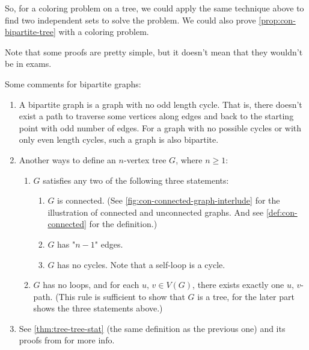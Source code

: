 \documentclass[../src/handouts/main.tex]{subfiles}
\begin{document}
So, for a coloring problem on a tree, we could apply the same technique above to find two independent sets to solve the problem. We could also prove \cref{prop:con-bipartite-tree} with a coloring problem. %

Note that some proofs are pretty simple, but it doesn't mean that they wouldn't be in exams.

Some comments for bipartite graphs:
\begin{enumerate}
  \item \label{enum:con-bipartite-odd} A bipartite graph is a graph with no odd length cycle. That is, there doesn't exist a path to traverse some vertices along edges and back to the starting point with odd number of edges. For a graph with no possible cycles or with only even length cycles, such a graph is also bipartite. 

  \item \label{enum:con-tree-state} Another ways to define an $n$-vertex tree $G$, where $n \geq 1$:
    \begin{enumerate}
      \item $G$ satisfies any two of the following three statements:
        \begin{enumerate}
          \item $G$ is connected. (See \cref{fig:con-connected-graph-interlude} for the illustration of connected and unconnected graphs. And see \cref{def:con-connected} for the definition.)
          \item $G$ has "$n - 1$" edges.
          \item $G$ has no cycles. Note that a self-loop is a cycle.
        \end{enumerate}
      \item $G$ has no loops, and for each $u,\, v \in V(G)$, there exists exactly one $u,\, v$-path. (This rule is sufficient to show that $G$ is a tree, for the later part shows the three statements above.)
    \end{enumerate}

  \item See \cref{thm:tree-tree-stat} (the same definition as the previous one) and its proofs from  for more info.
\end{enumerate}
\end{document}
